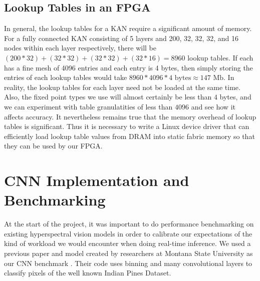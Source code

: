 \documentclass[psamsfonts]{amsart}
\theoremstyle{definition}
\theoremstyle{remark}
\numberwithin{equation}{section}
\begin{document}
\subsection{Lookup Tables in an FPGA}
In general, the lookup tables for a KAN require a significant amount of memory. For a fully connected KAN consisting of 5 layers and 200, 32, 32, 32, and 16 nodes within each layer respectively, there will be $(200 * 32) + (32 * 32) + (32 * 32) + (32 * 16) = 8960$ lookup tables. If each has a fine mesh of 4096 entries and each entry is 4 bytes, then simply storing the entries of each lookup tables would take $8960 * 4096 * 4 \text{ bytes} \approx 147 \text{ Mb}$. In reality, the lookup tables for each layer need not be loaded at the same time. Also, the fixed point types we use will almost certainly be less than $4$ bytes, and we can experiment with table granulatities of less than $4096$ and see how it affects accuracy. It nevertheless remains true that the memory overhead of lookup tables is significant. Thus it is necessary to write a Linux device driver that can efficiently load lookup table values from DRAM into static fabric memory so that they can be used by our FPGA.



\section{CNN Implementation and Benchmarking}
At the start of the project, it was important to do performance benchmarking on existing hyperspectral vision models in order to calibrate our expectations of the kind of workload we would encounter when doing real-time inference. We used a previous paper and model created by researchers at Montana State University as our CNN benchmark \cite{Morales_2021} \cite{rs13183649}. Their code uses binning and many convolutional layers to classify pixels of the well known Indian Pines Dataset.
\end{document}
